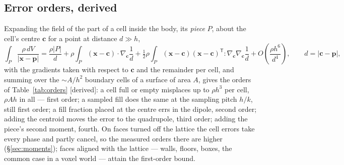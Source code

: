\documentclass[10pt,a4paper]{article}
\newcommand{\tagD}{\textsf{\small[derived]}}
\begin{document}
\subsection{Error orders, derived}\label{sec:orders}

Expanding the field of the part of a cell inside
the body, its \emph{piece} $P$, about the cell's centre $\mathbf{c}$ for a point at distance
$d\gg h$,
\begin{equation}
\int_P \frac{\rho\,dV}{|\mathbf{x}-\mathbf{p}|} = \frac{\rho|P|}{d}
 + \rho\!\int_P(\mathbf{x}-\mathbf{c})\cdot\nabla_{\mathbf{c}}\frac1{d} + \tfrac12\rho\!\int_P
 (\mathbf{x}-\mathbf{c})(\mathbf{x}-\mathbf{c})^{\mathsf T}\!:\nabla_{\mathbf{c}}\nabla_{\mathbf{c}}\frac1{d}
 +O\!\left(\frac{\rho h^6}{d^4}\right),\qquad d=|\mathbf{c}-\mathbf{p}|,
\label{eq:taylor}
\end{equation}
with the gradients taken with respect to $\mathbf{c}$ and the remainder per cell, and summing over the $\sim A/h^2$ boundary
cells of a surface of area $A$, gives the orders of Table~\ref{tab:orders} \tagD: a cell full or
empty misplaces up to $\rho h^3$ per cell, $\rho A h$ in all --- first order; a sampled fill does the
same at the sampling pitch $h/k$, still first order; a fill fraction placed at the centre errs in the
dipole, second order; adding the centroid moves the error to the quadrupole, third order; adding the
piece's second moment, fourth. On faces turned off the lattice the cell errors take every phase and
partly cancel, so the measured orders there are higher (\S\ref{sec:moments}); faces aligned with the
lattice --- walls, floors, boxes, the common case in a voxel world --- attain the first-order bound.
\end{document}
